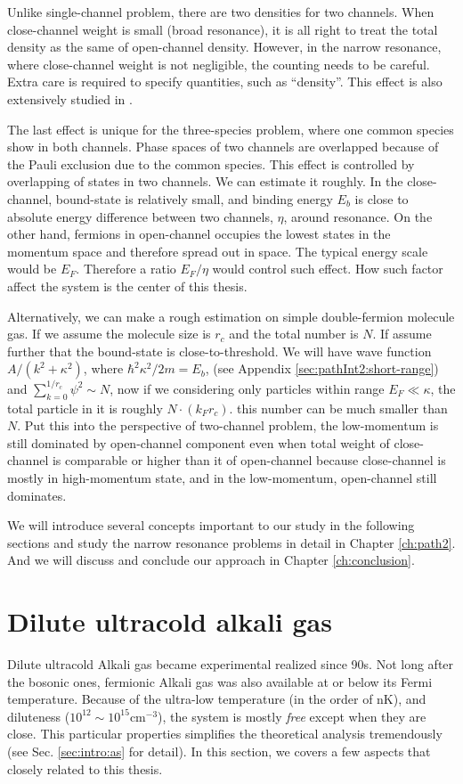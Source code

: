 Unlike single-channel problem, there are two densities for two channels. When close-channel weight is small (broad resonance), it is all right to treat the total density as the same of open-channel density.  However, in the narrow resonance, where close-channel weight is not negligible, the counting needs to be careful.  Extra care is required to specify quantities, such as ``density''.  This effect is also extensively studied in \cite{GurarieNarrow}.

The last effect is unique for the three-species problem, where one common species show in both channels.  Phase spaces of two channels are overlapped because of the Pauli exclusion due to the common species. This effect is controlled by overlapping of states in two channels. We can estimate it roughly.  In the close-channel, bound-state is relatively small, and binding energy $E_b$ is close to absolute energy difference between two channels, $\eta$, around resonance.  On the other hand, fermions in open-channel occupies the lowest states in the momentum space and therefore spread out in space.  The typical energy scale would be $E_F$.  Therefore a ratio $E_F/\eta$ would control such effect. How such factor affect the system is the center of this thesis. 

Alternatively, we can make a rough estimation on simple double-fermion molecule gas.  If we assume the molecule size is $r_{c}$ and the total number is $N$.  If assume further that the bound-state is close-to-threshold.  We will have wave function $A/(k^{2}+\kappa^{2})$, where $\hbar^{2}\kappa^{2}/2m=E_{b}$, (see Appendix \ref{sec:pathInt2:short-range}) and $\sum_{k=0}^{1/r_{c}}\psi^{2}\sim{}N$, now if we considering only particles within range $E_{F}\ll\kappa$, the total particle in it is roughly $N\cdot(k_{F}r_{c})$.  this number can be much smaller than $N$. Put this into the perspective of two-channel problem, the low-momentum is still dominated by open-channel component even when total weight of close-channel is comparable or higher than it of open-channel because close-channel is mostly in high-momentum state, and in the low-momentum, open-channel still dominates.     

We will introduce several concepts important to our study in the following sections and study the narrow resonance problems in detail in Chapter \ref{ch:path2}. And we will discuss and conclude our approach in Chapter \ref{ch:conclusion}.

\section{Dilute ultracold alkali gas}\label{sec:intro:one}
Dilute ultracold Alkali gas became experimental realized since 90s.  Not long after the bosonic ones, fermionic Alkali gas was also available at or below its Fermi temperature.  Because of the ultra-low temperature (in the order of nK), and diluteness ($10^{12}\sim10^{15}\text{cm}^{-3}$), the system is mostly \emph{free} except when they are close.   This particular properties simplifies the theoretical analysis tremendously (see Sec. \ref{sec:intro:as} for detail).  In this section, we covers a few aspects that closely related to this thesis.     

